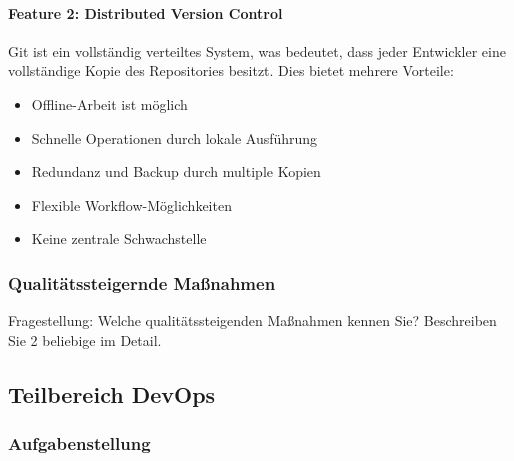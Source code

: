     \paragraph{Feature 2: Distributed Version Control}
    Git ist ein vollständig verteiltes System, was bedeutet, dass jeder Entwickler eine vollständige Kopie des Repositories besitzt.
    Dies bietet mehrere Vorteile:

    \begin{itemize}
        \item Offline-Arbeit ist möglich
        \item Schnelle Operationen durch lokale Ausführung
        \item Redundanz und Backup durch multiple Kopien
        \item Flexible Workflow-Möglichkeiten
        \item Keine zentrale Schwachstelle
    \end{itemize}






\subsubsection{Qualitätssteigernde Maßnahmen}

Fragestellung: Welche qualitätssteigenden Maßnahmen kennen Sie? Beschreiben Sie 2 beliebige im Detail.



\subsection{Teilbereich DevOps}

\subsubsection{Aufgabenstellung}

